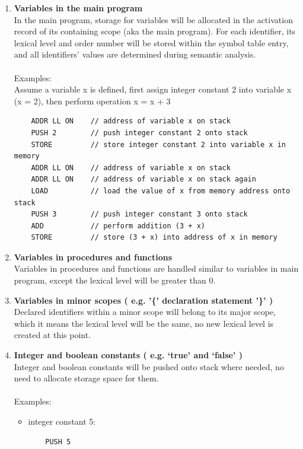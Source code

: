 \documentclass[11pt]{article}
\begin{document}
\begin{enumerate}[label=(\alph*)]
\item \textbf{Variables in the main program}\\
In the main program, storage for variables will be allocated in the 
activation record of its containing scope (aka the main program). For
each identifier, its lexical level and order number will be stored 
within the symbol table entry, and all identifiers’ values are 
determined during semantic analysis.\\
\\
Examples:\\
Assume a variable x is defined, first assign integer constant 2
into variable x (x = 2), then perform operation x = x + 3
    \begin{lstlisting}
    ADDR LL ON    // address of variable x on stack
    PUSH 2        // push integer constant 2 onto stack
    STORE         // store integer constant 2 into variable x in memory 
    ADDR LL ON    // address of variable x on stack
    ADDR LL ON    // address of variable x on stack again
    LOAD          // load the value of x from memory address onto stack
    PUSH 3        // push integer constant 3 onto stack
    ADD           // perform addition (3 + x)
    STORE         // store (3 + x) into address of x in memory
    \end{lstlisting}

\item \textbf{Variables in procedures and functions}\\
    Variables in procedures and functions are handled similar to
    variables in main program, except the lexical level will be greater
    than 0.
    
\item \textbf{Variables in minor scopes ( e.g. ’\{’ declaration
              statement ’\}’ )}\\
    Declared identifiers within a minor scope will belong to its major
    scope, which it means the lexical level will be the same, no new
    lexical level is created at this point.
    
\item \textbf{Integer and boolean constants ( e.g. `true' and
              `false' )}\\
    Integer and boolean constants will be pushed onto stack where needed,
    no need to allocate storage space for them.\\
    \\
    Examples:
    \begin{itemize}
    \item integer constant 5: 
    \begin{lstlisting}
    PUSH 5
    \end{lstlisting}
    

\end{itemize}
\end{enumerate}
\end{document}

